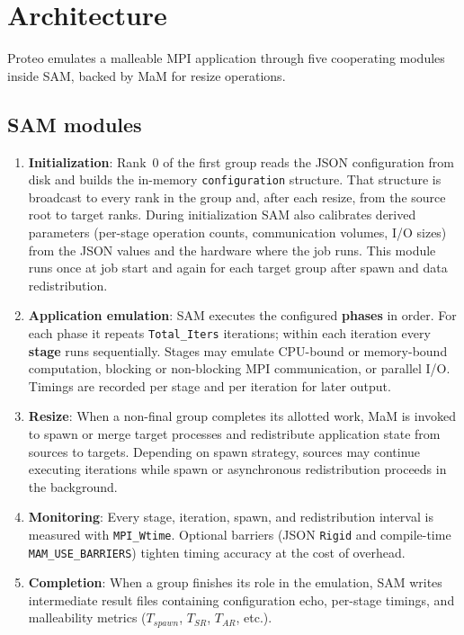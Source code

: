 \section{Architecture}
\label{section:architecture}

Proteo emulates a malleable MPI application through five cooperating modules inside SAM, backed by MaM for resize operations.

\subsection{SAM modules}
\label{subsection:sam-modules}

\begin{enumerate}
  \item \textbf{Initialization}: Rank~0 of the first group reads the JSON configuration from disk and builds the in-memory \texttt{configuration} structure. That structure is broadcast to every rank in the group and, after each resize, from the source root to target ranks. During initialization SAM also calibrates derived parameters (per-stage operation counts, communication volumes, I/O sizes) from the JSON values and the hardware where the job runs. This module runs once at job start and again for each target group after spawn and data redistribution.

  \item \textbf{Application emulation}: SAM executes the configured \textbf{phases} in order. For each phase it repeats \texttt{Total\_Iters} iterations; within each iteration every \textbf{stage} runs sequentially. Stages may emulate CPU-bound or memory-bound computation, blocking or non-blocking MPI communication, or parallel I/O. Timings are recorded per stage and per iteration for later output.

  \item \textbf{Resize}: When a non-final group completes its allotted work, MaM is invoked to spawn or merge target processes and redistribute application state from sources to targets. Depending on spawn strategy, sources may continue executing iterations while spawn or asynchronous redistribution proceeds in the background.

  \item \textbf{Monitoring}\label{subsection:monitoring}: Every stage, iteration, spawn, and redistribution interval is measured with \texttt{MPI\_Wtime}. Optional barriers (JSON \texttt{Rigid} and compile-time \texttt{MAM\_USE\_BARRIERS}) tighten timing accuracy at the cost of overhead.

  \item \textbf{Completion}: When a group finishes its role in the emulation, SAM writes intermediate result files containing configuration echo, per-stage timings, and malleability metrics ($T_{spawn}$, $T_{SR}$, $T_{AR}$, etc.).
\end{enumerate}


